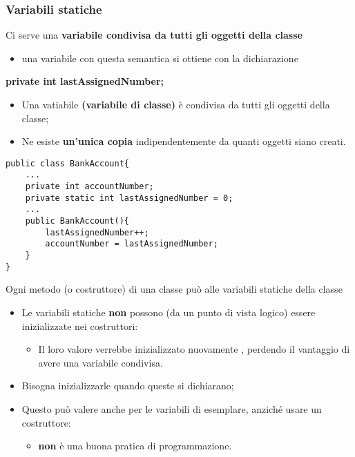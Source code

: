 \begin{frame}
\frametitle{Variabili statiche}
\begin{block}{}
Ci serve una \textbf{\alert{variabile condivisa da tutti gli oggetti della classe}}
\begin{itemize}
\item una variabile con questa semantica si ottiene con la dichiarazione \textbf{}
\end{itemize}
\end{block}
\hspace{0.8cm}\textbf{private  int \alert{lastAssignedNumber};}
\begin{block}{}
\begin{itemize}
\item Una vatiabile \textbf{ (variabile di classe)} è condivisa da tutti gli oggetti della classe;
\item Ne esiste \textbf{\alert{un'unica copia}} indipendentemente da quanti oggetti siano creati.
\end{itemize}
\end{block}
\end{frame}

\begin{frame}[fragile]
\begin{lstlisting}
public class BankAccount{ 
    ...
    private int accountNumber;
    private static int lastAssignedNumber = 0;
    ...
    public BankAccount(){ 
        lastAssignedNumber++;
        accountNumber = lastAssignedNumber;
    }
}
\end{lstlisting}
\begin{block}{}
Ogni metodo (o costruttore) di una classe può \textbf{} alle variabili statiche della classe 
\textbf{}
\end{block}
\end{frame}

\begin{frame}
\begin{block}{}
\begin{itemize}
\item Le variabili statiche \textbf{non} possono (da un punto di vista logico) essere inizializzate nei costruttori:
\begin{itemize}
\item Il loro valore verrebbe inizializzato nuovamente \textbf{}, perdendo
il vantaggio di avere una variabile condivisa.
\end{itemize}
\item Bisogna inizializzarle quando queste si dichiarano;
\item Questo può valere anche per le variabili di esemplare, anziché usare un costruttore:
\begin{itemize}
\item \textbf{non} è una buona pratica di programmazione.	
\end{itemize}
\end{itemize}
\end{block}
\end{frame}

